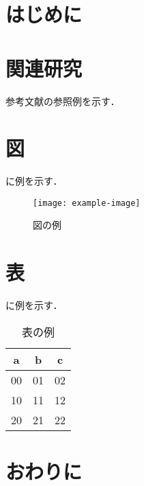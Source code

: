 \documentclass{abstract}
\begin{document}
\makeabstracttitle[
presentno={B9-99},
title={表題表題表題表題表題表題表題表題表\\題表題表題表題表題表題表題表題表題表題表題表題表題表題表題表題表題},
labname={サンプル研究室},
lastname={鳥取},
firstname={太郎},
]
\section{はじめに}
\section{関連研究}
参考文献の参照例を示す\cite{Article:2024:Toridai}．
\section{図}
に例を示す．

\begin{figure}[t]
  \centering
  \texttt{[image: example-image]}
  \caption{図の例}
  \label{fig:example-image}
\end{figure}
\section{表}
に例を示す．

\begin{table}[t]
  \centering
  \caption{表の例}
  \begin{tabular}{|c c c|}
    a & b & c \\
    \hline
    00 & 01 & 02 \\ 
    10 & 11 & 12 \\ 
    20 & 21 & 22 \\ 
  \end{tabular}
  \label{tab:example-example}
\end{table}
\section{おわりに}


\end{document}
